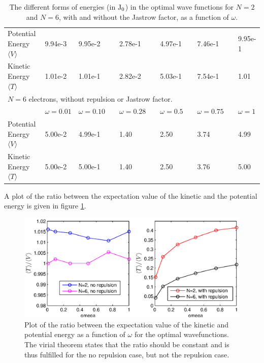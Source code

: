 \begin{table}[h!]
\begin{tabular}{l@{ } l@{ } l@{ } l@{ } l@{ } l@{ } l}
		\midrule
		Potential Energy $\langle V \rangle  \quad $ & 9.94e-3 & 9.95e-2 & 2.78e-1 & 4.97e-1 & 7.46e-1 & 9.95e-1\\
		\shaderow Kinetic Energy $\langle T \rangle$ & 1.01e-2 & 1.01e-1 & 2.82e-2 & 5.03e-1 & 7.54e-1 & 1.01\\
		\bottomrule
		\toprule
		\multicolumn{7}{l}{$N=6$ electrons, without repulsion or Jastrow factor.} \\
			& $\omega = 0.01$ &  $\omega = 0.10 \quad $ & $\omega =0.28 \quad $  & $\omega = 0.5 \quad $ & $\omega = 0.75 \quad $ & $\omega = 1$ \\
		\midrule
		Potential Energy $\langle V \rangle  \quad $ &  5.00e-2 & 4.99e-1 & 1.40 & 2.50 & 3.74 & 4.99\\
		\shaderow Kinetic Energy $\langle T \rangle$ &  5.00e-2 & 5.00e-1 & 1.40 & 2.50 & 3.76 & 5.00\\
		\bottomrule
	\end{tabular}
	\caption{The different forms of energies (in$~\textrm{J}_0$) in the optimal wave functions for $N=2$ and $N=6$, with and without the Jastrow factor, as a function of $\omega$.}
	\label{tab:res_virial}
\end{table}

A plot of the ratio between the expectation value of the kinetic and the potential energy is given in figure \ref{fig:res_virial}.

\begin{figure}[h!]
	\centering 
	\includegraphics[width=\textwidth]{results/virial.eps}
	\caption{Plot of the ratio between the expectation value of the kinetic and potential energy as a function of $\omega$ for the optimal wavefunctions. 
	The virial theorem states that the ratio should be constant and is thus fulfilled for the no repulsion case, but not the repulsion case.}
	\label{fig:res_virial}
\end{figure}

